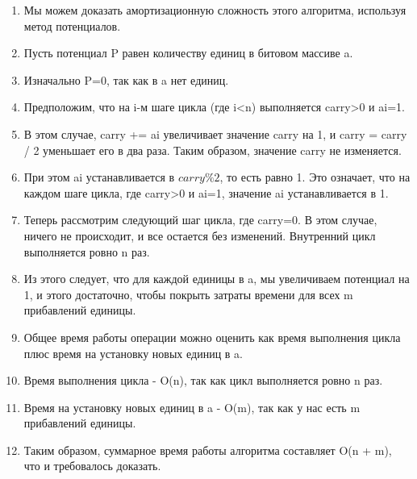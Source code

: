 \begin{enumerate}

	\item Мы можем доказать амортизационную сложность этого алгоритма, используя метод потенциалов.

	\item Пусть потенциал P равен количеству единиц в битовом массиве a. 
	
	\item Изначально P=0, так как в a нет единиц.
	
	\item Предположим, что на i-м шаге цикла (где i<n) выполняется carry>0 и ai=1. 
	
	\item В этом случае, carry += ai увеличивает значение carry на 1, и carry = carry / 2 уменьшает его в два раза. Таким образом, значение carry не изменяется.
	
	\item При этом ai устанавливается в $carry \% 2$, то есть равно 1. Это означает, что на каждом шаге цикла, где carry>0 и ai=1, значение ai устанавливается в 1.
	
	\item Теперь рассмотрим следующий шаг цикла, где carry=0. В этом случае, ничего не происходит, и все остается без изменений. Внутренний цикл выполняется ровно n раз.
	
	\item Из этого следует, что для каждой единицы в a, мы увеличиваем потенциал на 1, и этого достаточно, чтобы покрыть затраты времени для всех m прибавлений единицы.
	
	\item Общее время работы операции можно оценить как время выполнения цикла плюс время на установку новых единиц в a.
	
	\item Время выполнения цикла - O(n), так как цикл выполняется ровно n раз.
	
	\item Время на установку новых единиц в a - O(m), так как у нас есть m прибавлений единицы.
	
	\item Таким образом, суммарное время работы алгоритма составляет O(n + m), что и требовалось доказать.
	
\end{enumerate}
